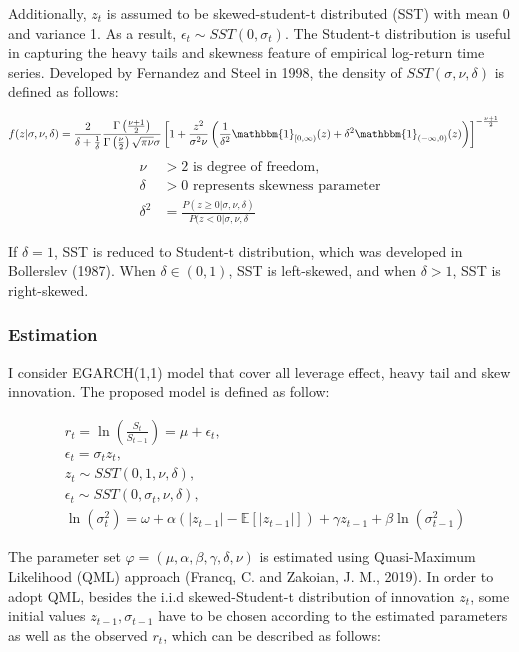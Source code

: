 \documentclass[12pt,a4paper]{article}
\numberwithin{equation}{section}
\begin{document}
Additionally, $z_t$ is assumed to be skewed-student-t distributed (SST) with mean 0 and variance 1. As a result, $\epsilon_t \sim SST(0, \sigma_t)$. The Student-t distribution is useful in capturing the heavy tails and skewness feature of empirical log-return time series. Developed by Fernandez and Steel in 1998, the density of $SST(\sigma, \nu, \delta)$ is defined as follows:


\begin{align}
f(z|\sigma, \nu, \delta) &= \frac{2}{\delta+ \frac{1}{\delta}} \frac{\Gamma\left(\frac{\nu + 1}{2}\right)}{\Gamma\left(\frac{\nu}{2}\right) \sqrt{\pi \nu}\sigma}
\left[ 1 + \frac{z^2}{\sigma^2 \nu} \left( \frac{1}{\delta^2} \mathbbm{1}_{[0, \infty)} (z) + \delta^2 \mathbbm{1}_{(-\infty, 0)} (z) \right) \right]^{-\frac{\nu + 1}{2}}
\end{align}
\begin{align}
\nu &>2 \text{ is degree of freedom}, \\
\delta&>0 \text{ represents skewness parameter}\\
\delta^2 &= \frac{P(z \ge 0| \sigma, \nu, \delta)}{P(z < 0| \sigma, \nu, \delta}
\end{align}

If $\delta = 1$, SST is reduced to Student-t distribution, which was developed in Bollerslev (1987). When $\delta  \in (0,1)$, SST is left-skewed, and when $\delta > 1$, SST is right-skewed.

\subsubsection{Estimation}

I consider EGARCH(1,1) model that cover all leverage effect, heavy tail and skew innovation. The proposed model is defined as follow:

\begin{align*}
 &r_t = \ln \left(\frac{S_t}{S_{t-1}}\right) = \mu + \epsilon_t ,\\[0.6em]
 &\epsilon_t = \sigma_t z_t,\\[0.6em]
 &z_t \sim SST(0, 1, \nu, \delta), \\[0.6em]
 &\epsilon_t \sim SST(0, \sigma_t, \nu, \delta), \\[0.6em]
 &\ln\left(\sigma_t^2\right) = \omega + \alpha \left( |z_{t-1}| - \mathbb{E}[|z_{t-1}|] \right) + \gamma z_{t-1} +  \beta \ln\left(\sigma_{t-1}^2\right)
 \end{align*}

The parameter set $ \varphi = (\mu, \alpha, \beta, \gamma, \delta, \nu)$ is estimated using Quasi-Maximum Likelihood (QML) approach (Francq, C. and Zakoian, J. M., 2019). In order to adopt QML, besides the i.i.d skewed-Student-t distribution of innovation $z_t$, some initial values $z_{t-1}, \sigma_{t-1}$  have to be chosen according to the estimated parameters as well as the observed $r_t$, which can be described as follows:
\end{document}
